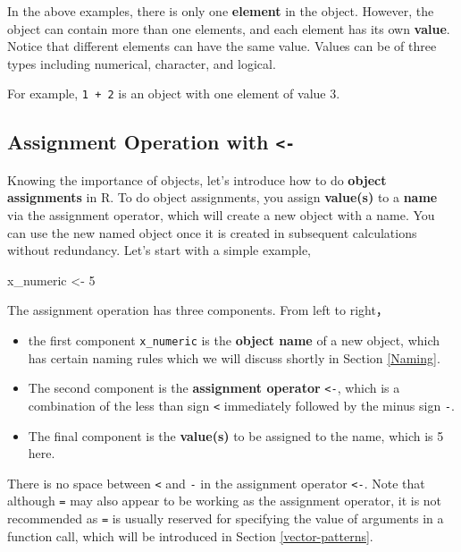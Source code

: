 \documentclass[
]{book}
\newenvironment{Shaded}{\begin{snugshade}}{\end{snugshade}}
\newcommand{\DecValTok}[1]{\textcolor[rgb]{0.00,0.00,0.81}{#1}}
\newcommand{\NormalTok}[1]{#1}
\newcommand{\OtherTok}[1]{\textcolor[rgb]{0.56,0.35,0.01}{#1}}
\providecommand{\tightlist}{%
  \setlength{\itemsep}{0pt}\setlength{\parskip}{0pt}}
\newenvironment{infobox}[1]
  {
  \begin{itemize}
  \renewcommand{\labelitemi}{
    \raisebox{-.7\height}[0pt][0pt]{
      {\setkeys{Gin}{width=3em,keepaspectratio}
        \texttt{[image: pics/\#1]}}
    }
  }
  \setlength{\fboxsep}{1em}
  \begin{blackbox}
  \item
  }
  {
  \end{blackbox}
  \end{itemize}
  }
\newenvironment{blackbox}{
  \definecolor{shadecolor}{rgb}{0, 0, 0}  %
  \color{white}
  \begin{shaded}}
 {\end{shaded}}
\begin{document}
In the above examples, there is only one \textbf{element} in the object. However, the object can contain more than one elements, and each element has its own \textbf{value}. Notice that different elements can have the same value. Values can be of three types including numerical, character, and logical.

For example, \texttt{1\ +\ 2} is an object with one element of value 3.

\hypertarget{assignment-operation-with--}{%
\subsection{\texorpdfstring{Assignment Operation with \texttt{\textless{}-}}{Assignment Operation with \textless-}}\label{assignment-operation-with--}}

Knowing the importance of objects, let's introduce how to do \textbf{object assignments} in R. To do object assignments, you assign \textbf{value(s)} to a \textbf{name} via the assignment operator, which will create a new object with a name. You can use the new named object once it is created in subsequent calculations without redundancy. Let's start with a simple example,

\begin{Shaded}
\begin{Highlighting}[]
\NormalTok{x\_numeric }\OtherTok{\textless{}{-}} \DecValTok{5}
\end{Highlighting}
\end{Shaded}

The assignment operation has three components. From left to right，

\begin{itemize}
\tightlist
\item
  the first component \texttt{x\_numeric} is the \textbf{object name} of a new object, which has certain naming rules which we will discuss shortly in Section \ref{Naming}.
\item
  The second component is the \textbf{assignment operator} \texttt{\textless{}-}, which is a combination of the less than sign \texttt{\textless{}} immediately followed by the minus sign \texttt{-}.
\item
  The final component is the \textbf{value(s)} to be assigned to the name, which is 5 here.
\end{itemize}

\begin{infobox}{caution}
There is no space between \texttt{\textless{}} and \texttt{-} in the assignment operator \texttt{\textless{}-}. Note that although \texttt{=} may also appear to be working as the assignment operator, it is not recommended as \texttt{=} is usually reserved for specifying the value of arguments in a function call, which will be introduced in Section \ref{vector-patterns}.

\end{infobox}
\end{document}
